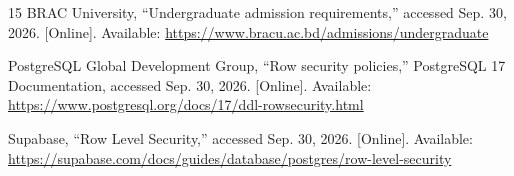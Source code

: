 \documentclass[conference,letterpaper]{IEEEtran}
\begin{document}
\begin{thebibliography}{15}
BRAC University, “Undergraduate admission requirements,” accessed Sep. 30, 2026. [Online]. Available: \url{https://www.bracu.ac.bd/admissions/undergraduate}

PostgreSQL Global Development Group, “Row security policies,” PostgreSQL 17 Documentation, accessed Sep. 30, 2026. [Online]. Available: \url{https://www.postgresql.org/docs/17/ddl-rowsecurity.html}

Supabase, “Row Level Security,” accessed Sep. 30, 2026. [Online]. Available: \url{https://supabase.com/docs/guides/database/postgres/row-level-security}
\end{thebibliography}
\end{document}

